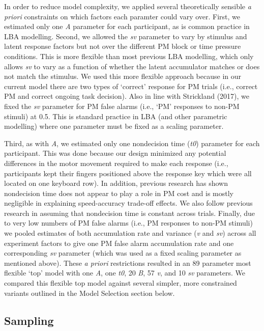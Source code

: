 \documentclass[11pt,]{article}
\begin{document}
In order to reduce model complexity, we applied several theoretically
sensible \emph{a priori} constraints on which factors each paramter
could vary over. First, we estimated only one \emph{A} parameter for
each participant, as is common practice in LBA modelling. Second, we
allowed the \emph{sv} parameter to vary by stimulus and latent response
factors but not over the different PM block or time pressure conditions.
This is more flexible than most previous LBA modelling, which only
allows \emph{sv} to vary as a function of whether the latent accumulator
matches or does not match the stimulus. We used this more flexible
approach because in our current model there are two types of `correct'
response for PM trials (i.e., correct PM and correct ongoing task
decision). Also in line with Strickland (2017), we fixed the \emph{sv}
parameter for PM false alarms (i.e., `PM' responses to non-PM stimuli)
at 0.5. This is standard practice in LBA (and other parametric
modelling) where one parameter must be fixed as a scaling parameter.

Third, as with \emph{A}, we estimated only one nondecision time
(\emph{t0}) parameter for each participant. This was done because our
design minimized any potential differences in the motor movement
required to make each response (i.e., participants kept their fingers
positioned above the response key which were all located on one keyboard
row). In addition, previous research has shown nondecision time does not
appear to play a role in PM cost and is mostly negligible in explaining
speed-accuracy trade-off effects. We also follow previous research in
assuming that nondecision time is constant across trials. Finally, due
to very low numbers of PM false alarms (i.e., PM responses to non-PM
stimuli) we pooled estimates of both accumulation rate and variance
(\emph{v} and \emph{sv}) across all experiment factors to give one PM
false alarm accumulation rate and one corresponding \emph{sv} parameter
(which was used as a fixed scaling parameter as mentioned above). These
\emph{a priori} restrictions resulted in an 89 parameter most flexible
`top' model with one \emph{A}, one \emph{t0}, 20 \emph{B}, 57 \emph{v},
and 10 \emph{sv} parameters. We compared this flexible top model against
several simpler, more constrained variants outlined in the Model
Selection section below.

\subsection{Sampling}\label{sampling}
\end{document}
